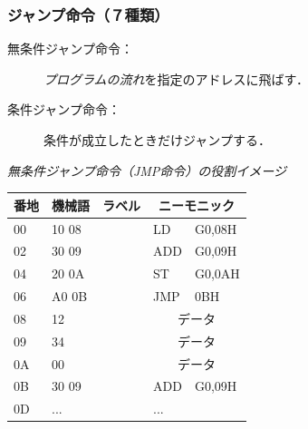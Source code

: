 \documentclass[handout]{beamer}        %
\begin{document}
\begin{frame}
  \frametitle{ジャンプ命令（７種類）}
  \begin{description}
  \item[無条件ジャンプ命令：]\emph{プログラムの流れ}を指定のアドレスに飛ばす．
  \item[条件ジャンプ命令：]条件が成立したときだけジャンプする．
  \end{description}
  \vfill

  \emph{無条件ジャンプ命令（JMP命令）の役割イメージ}\\
  {\ttfamily\small\begin{center}
    \begin{tabular}{|l|l|l|l l|} \hline
      番地 & 機械語 & ラベル & \multicolumn{2}{|c|}{ニーモニック} \\
      \hline
      00 & 10 08 &             & LD   & G0,08H                \\
      02 & 30 09 &             & ADD  & G0,09H                \\
      04 & 20 0A &             & ST   & G0,0AH                \\
      06 & A0 0B &             & JMP  & 0BH                   \\
      08 & 12    &             & \multicolumn{2}{|c|}{データ} \\
      09 & 34    &             & \multicolumn{2}{|c|}{データ} \\
      0A & 00    &             & \multicolumn{2}{|c|}{データ} \\
      0B & 30 09 &             & ADD  & G0,09H                \\
      0D & ...   &             & ...  &                       \\
      \hline
    \end{tabular}
    \end{center}}
  \vfill
\end{frame}
\end{document}
